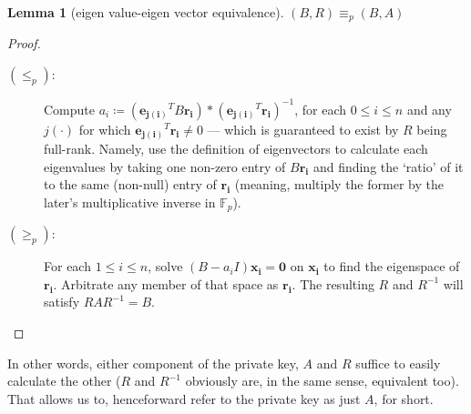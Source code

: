 \documentclass[a4paper,10pt]{article}
\theoremstyle{plain}
\theoremstyle{definition}
\newtheorem{lemm}[thm]{Lemma} %
\theoremstyle{named}
\begin{document}
\begin{lemm}[eigen value-eigen vector equivalence]
\label{lemm:eveveq}
$(B,R) \equiv_p (B,A)$
\end{lemm}
\begin{proof}
$\,$%
\begin{description}
 \item [$(\leq_p)$:] Compute $a_i \coloneqq (\mathbf{e_{j(i)}}^TB\mathbf{r_i})*(\mathbf{e_{j(i)}}^T\mathbf{r_i})^{-1}$, for each $0 \leq i \leq n$ and any $j(\cdot)$ for which $\mathbf{e_{j(i)}}^T\mathbf{r_i} \neq 0$ --- which is guaranteed to exist by $R$ being full-rank. Namely, use the definition of eigenvectors to calculate each eigenvalues by taking one non-zero entry of $B\mathbf{r_i}$ and finding the `ratio' of it to the same (non-null) entry of $\mathbf{r_i}$ (meaning, multiply the former by the later's multiplicative inverse in $\mathbb{F}_p$).
 \item [$(\geq_p)$:] For each $1 \leq i \leq n$, solve $(B-a_iI)\mathbf{x_i}=\mathbf{0}$ on $\mathbf{x_i}$ to find the eigenspace of $\mathbf{r_i}$. Arbitrate any member of that space as $\mathbf{r_i}$. The resulting $R$ and $R^{-1}$ will satisfy $RAR^{-1}=B$.
 
\end{description}
\end{proof}
In other words, either component of the private key, $A$ and $R$ suffice to easily calculate the other ($R$ and $R^{-1}$ obviously are, in the same sense, equivalent too). That allows us to, henceforward refer to the private key as just $A$, for short.
\end{document}
